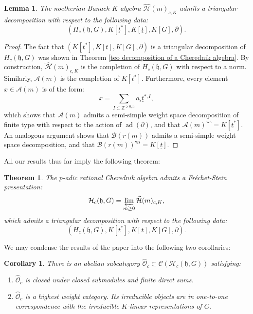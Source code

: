 \documentclass{amsart}
\newtheorem{teo}[defi]{ Theorem}
\newtheorem{Lemma}[defi]{Lemma}
\newtheorem{coro}[defi]{Corollary}
\newcommand{\OX}{\mathcal{O}}
\begin{document}
\begin{Lemma}
The noetherian Banach $K$-algebra $\widehat{\mathcal{H}}(m)_{c,K}$ admits a triangular decomposition with respect to the following data:
\begin{equation*}
    (H_c(\mathfrak{h},G), K[\underline{t}^*], K[\underline{t}], K[G], \partial).
\end{equation*}
\end{Lemma}
\begin{proof}
The fact that $(K[\underline{t}^*], K[\underline{t}], K[G], \partial)$ is a triangular decomposition of $H_c(\mathfrak{h},G)$ was shown in  Theorem  \ref{teo decomposition of a Cherednik algebra}. By construction, $\widehat{\mathcal{H}}(m)_{c,K}$ is the completion of $H_c(\mathfrak{h},G)$ with respect to a norm. Similarly, 
$\mathscr{A}(m)$ is the completion of $K[\underline{t}^*]$. Furthermore, every element $x\in \mathscr{A}(m)$ is of the form:
\begin{equation*}
    x=\sum_{I\subset \mathbb{Z}^{\geq 0,n}} a_i \underline{t}^{*,I},
\end{equation*}
which shows that $\mathscr{A}(m)$ admits a semi-simple weight space decomposition of finite type with respect to the action of $\operatorname{ad}(\partial)$, and that $\mathscr{A}(m)^{\operatorname{ws}}=K[\underline{t}^*]$. An analogous argument shows that $\mathscr{B}(r(m))$ admits a semi-simple weight space decomposition, and that  $\mathscr{B}(r(m))^{\operatorname{ws}}=K[\underline{t}]$.
\end{proof}
All our results thus far imply the following theorem:
\begin{teo}\label{teo category O p-adic rat Cher}
The $p$-adic rational Cherednik algebra admits a Fréchet-Stein presentation:
\begin{equation*}
    \mathcal{H}_c(\mathfrak{h},G)=\varprojlim_{m\geq 0}\widehat{\mathcal{H}}(m)_{c,K},
\end{equation*}
which admits a triangular decomposition with respect to the following data:
\begin{equation*}
    (H_c(\mathfrak{h},G), K[\underline{t}^*], K[\underline{t}], K[G], \partial).
\end{equation*}
\end{teo}
We may condense the  results of the paper into the following two corollaries:
\begin{coro}
There is an abelian subcategory $\wideparen{\OX}_c\subset \mathcal{C}(\mathcal{H}_c(\mathfrak{h},G))$  satisfying:
\begin{enumerate}[label=(\roman*)]
    \item $\wideparen{\OX}_c$ is closed under closed submodules and finite direct sums.
    \item $\wideparen{\OX}_c$ is a highest weight category. Its irreducible objects are in one-to-one correspondence with the irreducible $K$-linear representations of $G$.
\end{enumerate}
\end{coro}
\end{document}
